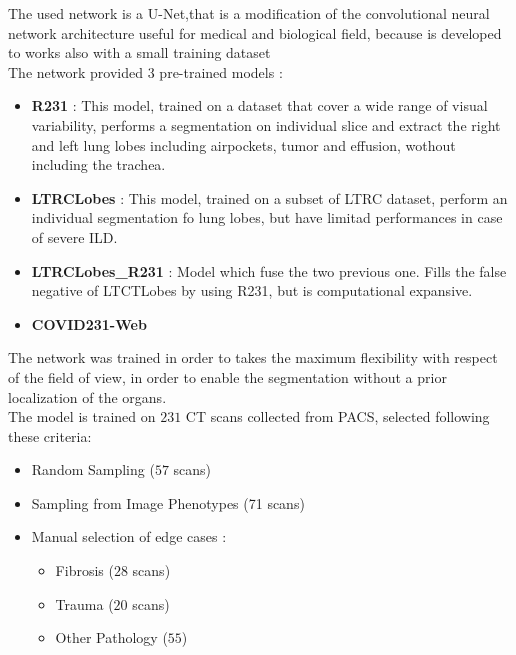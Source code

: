 \documentclass{standalone}
\begin{document}
	The used network is a U-Net,that is a modification of the convolutional neural network architecture useful for medical and biological field, because is developed to works also with a small training dataset\\
	The network provided 3 pre-trained models : 
	\begin{itemize}
		\item \textbf{R231} : This model, trained on a dataset that cover a wide range of visual variability, performs a segmentation on individual slice and extract the right and left lung lobes including airpockets, tumor and effusion, wothout including the trachea.
		
		\item \textbf{LTRCLobes} : This model, trained on a subset of LTRC dataset, perform an individual segmentation fo lung lobes, but have limitad performances in case of severe ILD.
		
		\item \textbf{LTRCLobes\_R231} : Model which fuse the two previous one. Fills the false negative of LTCTLobes by using R231, but is computational expansive.
		
		\item \textbf{COVID231-Web}
	\end{itemize}
	
	The network was trained in order to takes the maximum flexibility with respect of the field of view, in order to enable the segmentation without a prior localization of the organs.\\
	The model is trained on $231$ CT scans collected from PACS, selected following these criteria: 
	\begin{itemize}
		\item Random Sampling ($57$ scans)
		
		\item Sampling from Image Phenotypes (71 scans)
		
		\item Manual selection of edge cases : 
			\begin{itemize}
				\item Fibrosis ($28$ scans)
				
				\item Trauma ($20$ scans)
				
				\item Other Pathology ($55$)
				
			\end{itemize}
	\end{itemize}
	
	 
\end{document}
